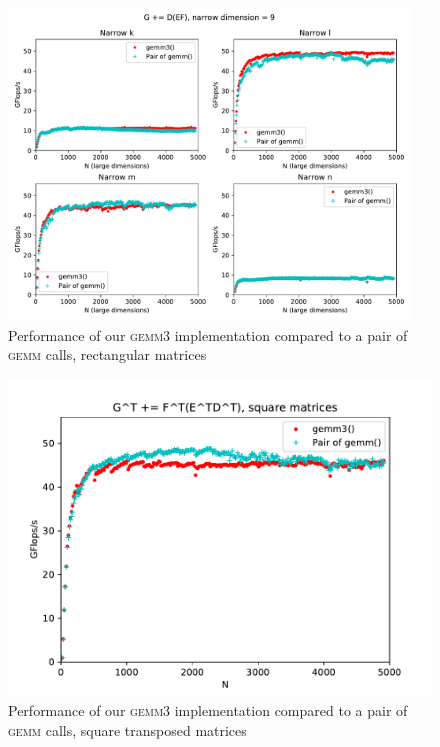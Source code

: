 \documentclass[12pt]{article}
\newcommand*{\gemmt}{{\textsc{gemm3}}}
\newcommand*{\gemm}{{\textsc{gemm}}}
\begin{document}
\begin{figure}
  \centering
  \includegraphics[width=0.95\textwidth]{../results/earwig2/gemm3_rectangles}
  \caption{Performance of our \gemmt{} implementation compared to a pair of \gemm{} calls, rectangular matrices}
  \label{fig:bc_rectangles}
\end{figure}

\begin{figure}
  \centering
  \includegraphics[height=0.40\textheight]{../results/earwig2/gemm3_ab_bc_kernel}
  \caption{Performance of our \gemmt{} implementation compared to a pair of \gemm{} calls, square transposed matrices}
  \label{fig:ab_square}
\end{figure}
\end{document}
